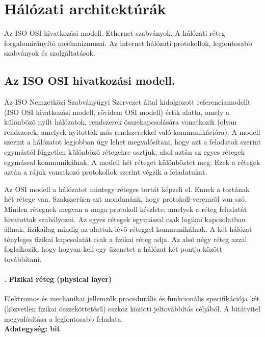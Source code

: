 \section{Hálózati architektúrák}
{\footnotesize Az ISO OSI hivatkozási modell. Ethernet szabványok. A hálózati réteg forgalomirányító mechanizmusai. Az internet hálózati protokollok, legfontosabb szabványok és szolgáltatások.}
\subsection{Az ISO OSI hivatkozási modell.}
Az ISO Nemzetközi Szabványügyi Szervezet által kidolgozott referenciamodellt (ISO OSI hivatkozási modell, röviden: OSI modell) értik alatta, amely a különbözõ nyílt hálózatok, rendszerek összekapcsolására vonatkozik (olyan rendszerek, amelyek nyitottak más rendszerekkel való kommunikációra). A modell szerint a hálózatot legjobban úgy lehet megvalósítani, hogy azt a feladatok szerint egymástól független különbözõ rétegekre osztjuk, ahol aztán az egyes rétegek egymással kommunikálnak. A modell hét réteget különböztet meg. Ezek a rétegek aztán a rájuk vonatkozó protokollok szerint végzik a feladatukat.

Az OSI modell a hálózatot mintegy réteges tortát képzeli el. Ennek a tortának hét rétege van. Szakszerûen azt mondanánk, hogy protokoll-veremrõl van szó. Minden rétegnek megvan a maga protokoll-készlete, amelyek a réteg feladatát hivatottak szabályozni. Az egyes rétegek egymással csak logikai kapcsolatban állnak, fizikailag mindig az alattuk lévõ réteggel kommunikálnak. A két hálózat tényleges fizikai kapcsolatát csak a fizikai réteg adja. Az alsó négy réteg azzal foglalkozik, hogy hogyan kell egy üzenetet a hálózat két pontja között továbbítani.
\setcounter{paragraph}{1}
\paragraph[Fizikai réteg]{. Fizikai réteg (physical layer)}
Elektromos és mechanikai jellemzők procedurális és funkcionális specifikációja két (közvetlen fizikai összeköttetésű) eszköz közötti jeltovábbítás céljából. A bitátvitel megvalósítása a legfontosabb feladata.\\
\textbf{Adategység: bit}
